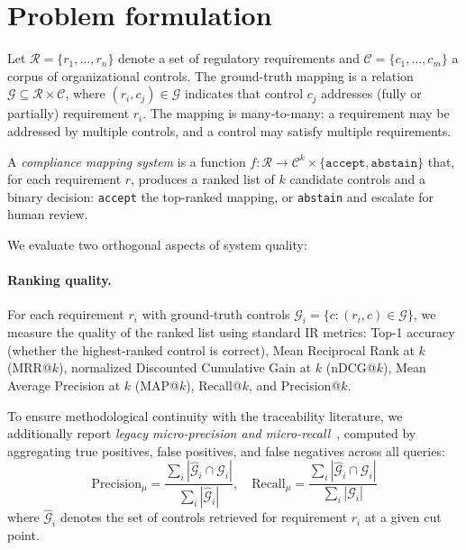 \documentclass[a4paper,fleqn]{cas-sc}
\begin{document}
\section{Problem formulation}
\label{sec:formulation}


Let $\mathcal{R} = \{r_1, \ldots, r_n\}$ denote a set of regulatory requirements and $\mathcal{C} = \{c_1, \ldots, c_m\}$ a corpus of organizational controls.
The ground-truth mapping is a relation $\mathcal{G} \subseteq \mathcal{R} \times \mathcal{C}$, where $(r_i, c_j) \in \mathcal{G}$ indicates that control $c_j$ addresses (fully or partially) requirement $r_i$.
The mapping is many-to-many: a requirement may be addressed by multiple controls, and a control may satisfy multiple requirements.

A \emph{compliance mapping system} is a function $f: \mathcal{R} \rightarrow \mathcal{C}^k \times \{\texttt{accept}, \texttt{abstain}\}$ that, for each requirement $r$, produces a ranked list of $k$ candidate controls and a binary decision: \texttt{accept} the top-ranked mapping, or \texttt{abstain} and escalate for human review.

\label{sec:metrics}

We evaluate two orthogonal aspects of system quality:

\paragraph{Ranking quality.}
For each requirement $r_i$ with ground-truth controls $\mathcal{G}_i = \{c : (r_i, c) \in \mathcal{G}\}$, we measure the quality of the ranked list using standard IR metrics: Top-1 accuracy (whether the highest-ranked control is correct), Mean Reciprocal Rank at $k$ (MRR@$k$), normalized Discounted Cumulative Gain at $k$ (nDCG@$k$), Mean Average Precision at $k$ (MAP@$k$), Recall@$k$, and Precision@$k$.

To ensure methodological continuity with the traceability literature, we additionally report \emph{legacy micro-precision and micro-recall}~\citep{MarcusMaletic2003}, computed by aggregating true positives, false positives, and false negatives across all queries:
\begin{equation}
\text{Precision}_\mu = \frac{\sum_i |\hat{\mathcal{G}}_i \cap \mathcal{G}_i|}{\sum_i |\hat{\mathcal{G}}_i|}, \quad
\text{Recall}_\mu = \frac{\sum_i |\hat{\mathcal{G}}_i \cap \mathcal{G}_i|}{\sum_i |\mathcal{G}_i|}
\end{equation}
where $\hat{\mathcal{G}}_i$ denotes the set of controls retrieved for requirement $r_i$ at a given cut point.
\end{document}
